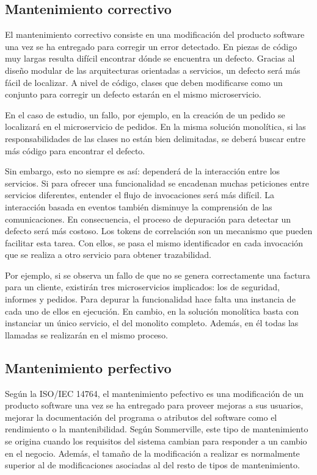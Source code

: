 \documentclass[11pt,spanish,listoffigures]{tfgetsinf}
\begin{document}
\subsection{Mantenimiento correctivo}

El mantenimiento correctivo consiste en una modificación del producto software una vez se ha entregado para corregir un error detectado. \cite{Bourque2014} En piezas de código muy largas resulta difícil encontrar dónde se encuentra un defecto. Gracias al diseño modular de las arquitecturas orientadas a servicios, un defecto será más fácil de localizar. A nivel de código, clases que deben modificarse como un conjunto para corregir un defecto estarán en el mismo microservicio.

En el caso de estudio, un fallo, por ejemplo, en la creación de un pedido se localizará en el microservicio de pedidos. En la misma solución monolítica, si las responsabilidades de las clases no están bien delimitadas, se deberá buscar entre más código para encontrar el defecto.

Sin embargo, esto no siempre es así: dependerá de la interacción entre los servicios. Si para ofrecer una funcionalidad se encadenan muchas peticiones entre servicios diferentes, entender el flujo de invocaciones será más difícil. La interacción basada en eventos también disminuye la comprensión de las comunicaciones. En consecuencia, el proceso de depuración para detectar un defecto será más costoso. Los tokens de correlación son un mecanismo que pueden facilitar esta tarea. Con ellos, se pasa el mismo identificador en cada invocación que se realiza a otro servicio para obtener trazabilidad. \cite{Baum2016}

Por ejemplo, si se observa un fallo de que no se genera correctamente una factura para un cliente, existirán tres microservicios implicados: los de seguridad, informes y pedidos. Para depurar la funcionalidad hace falta una instancia de cada uno de ellos en ejecución. En cambio, en la solución monolítica basta con instanciar un único servicio, el del monolito completo. Además, en él todas las llamadas se realizarán en el mismo proceso.

\subsection{Mantenimiento perfectivo}


Según la ISO/IEC 14764, el mantenimiento pefectivo es una modificación de un producto software una vez se ha entregado para proveer mejoras a sus usuarios, mejorar la documentación del programa o atributos del software como el rendimiento o la mantenibilidad. \cite{Bourque2014} Según Sommerville, este tipo de mantenimiento se origina cuando los requisitos del sistema cambian para responder a un cambio en el negocio. Además, el tamaño de la modificación a realizar es normalmente superior al de modificaciones asociadas al del resto de tipos de mantenimiento. \cite{Sommerville2010}
\end{document}
